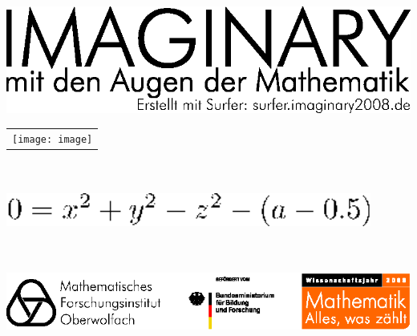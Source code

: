 \documentclass[a5paper]{article}
\begin{document}
\titlepage{}

\begin{center}
\includegraphics[width=14cm]{surfer_print_header}  
\end{center}


\begin{center}
\begin{tabular}{c}
  \texttt{[image: image]}
\end{tabular}
{
\includegraphics[keepaspectratio,height=3.2cm,width=12cm]{eps_formula}
}
\end{center}


\vfill

\begin{center}
\includegraphics[width=14cm]{surfer_print_footer}  
\end{center}
\end{document}
